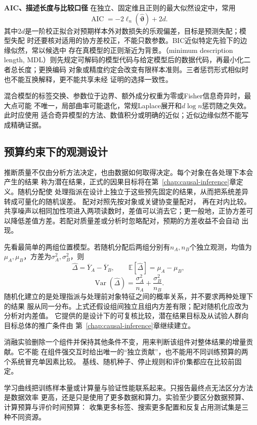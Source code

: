 \par\medskip\noindent\textbf{AIC、描述长度与比较口径}\quad
在独立、固定维且正则的最大似然设定中，常用
\[
  \operatorname{AIC}
  =-2\ell_n(\widehat{\bm\vartheta})+2d.
\]
其中\(2d\)是一阶校正拟合对预期样本外对数损失的乐观偏差，目标是预测失配；模型失配
时还要核对适用的协方差校正，不能只数参数。BIC近似特定先验下的边缘似然，常以候选中
存在真模型的正则渐近为背景。（minimum description length,
MDL）则先规定可解码的模型代码与给定模型后的数据代码，再最小化二者总长度；更换编码
对象或精度约定会改变有限样本准则。三者惩罚形式相似时也不能互换解释，更不能共享未经
证明的选择一致性。

混合模型的标签交换、参数位于边界、额外成分权重为零或Fisher信息奇异时，最大点可能
不唯一，局部曲率可能退化，常规Laplace展开和\(d\log n\)惩罚随之失效。此时应使用
适合奇异模型的方法、数值积分或明确的近似；近似边缘似然不能写成精确证据。

\subsection{预算约束下的观测设计}
\label{sec:statistics-design-information}
推断质量不仅由分析方法决定，也由数据如何取得决定。每个对象在各处理下本会产生的结果
称为潜在结果，正式的因果目标将在第~\ref{chap:causal-inference}章定义。随机分配使
处理指派在设计上独立于这些预先固定的结果，从而把系统差异转成可量化的随机误差。
配对对照先按对象或关键协变量配对，
再在对内比较。共享噪声以相同加性项进入两项读数时，差值可以消去它；更一般地，正协方差可以降低差值方差。若配对质量差或分析时忽略配对，预期的方差收益不会自动
出现。

先看最简单的两组位置模型。若随机分配后两组分别有\(n_A,n_B\)个独立观测，均值为
\(\mu_A,\mu_B\)，方差为\(\sigma_A^2,\sigma_B^2\)，则
\[
  \widehat\Delta=\overline Y_A-\overline Y_B,\qquad
  \mathbb{E}[\widehat\Delta]=\mu_A-\mu_B,
\]
\[
  \operatorname{Var}(\widehat\Delta)
  =\frac{\sigma_A^2}{n_A}+\frac{\sigma_B^2}{n_B}.
\]
随机化建立的是处理指派与处理前对象特征之间的概率关系，并不要求两种处理下的结果
服从同一分布。上式还假设组间独立且组内方差有限；配对随机化应改为分析对内差值。
它提供的是设计下的可复核比较，潜在结果目标及从试验人群向目标总体的推广条件由
第~\ref{chap:causal-inference}章继续建立。

消融实验删除一个组件并保持其他条件不变，用来判断该组件对整体结果的增量贡献。它不能
在组件强交互时给出唯一的“独立贡献”，也不能用不同训练预算的两个系统冒充单因素比较。
基线、随机种子、停止规则和评价集都应在比较前固定。

学习曲线把训练样本量或计算量与验证性能联系起来。只报告最终点无法区分方法是数据效率
更高，还是只是使用了更多数据和算力。实验至少要区分数据预算、计算预算与评价时间预算：
收集更多标签、搜索更多配置和反复占用测试集是三种不同资源。

